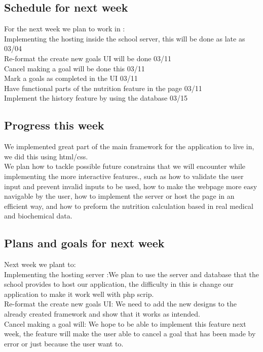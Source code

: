 \documentclass[a4paper]{article}
\begin{document}
\subsection{Schedule for next week} 
For the next week we plan to work in :\\	

\noindent Implementing the hosting inside the school server, this will be done as late as  03/04\\
\noindent Re-format the create new goals UI will be done 03/11\\
\noindent Cancel making a goal will be done this 03/11\\
\noindent Mark a goals as completed in the UI 03/11\\
\noindent Have functional parts of the nutrition feature in the page 03/11\\
\noindent Implement the history feature by using the database 03/15\\

\subsection{Progress this week }
We implemented great part of the main framework for the application to live in, we did this using html/css.\\
\noindent We plan how to tackle possible future constrains that we will encounter while implementing the more interactive features., such as how to validate the user input and prevent invalid inputs to be used, how to make the webpage more easy navigable by the user, how to implement the server or host the page in an efficient way, and how to preform the nutrition calculation based in real  medical and biochemical data.
\subsection{Plans and goals for next week}
Next week we plant to:\\
Implementing the hosting server :We plan to use the server and database that the school provides to host our application, the difficulty in this is change our application to make it work well with php scrip.\\

\noindent Re-format the create new goals UI: We need to add the new designs  to the already created framework and show that it works as intended.\\

\noindent Cancel making a goal will: We hope to be able to implement this feature next week, the feature will make the user able to cancel a goal that has been made by error or just because the user want to.\\
\end{document}
